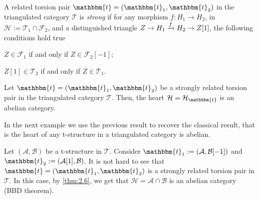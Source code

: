\begin{definition}
  A related torsion pair $\mathbbm{t}=(\mathbbm{t}_1,\mathbbm{t}_2)$ in the triangulated category
  $\mathcal{T}$ is \emph{strong} if for any morphism $f:H_1\to H_2$, in $\mathcal{H}:=\mathcal{T}_1\cap\mathcal{F}_2$,
  and a distinguished triangle $Z\to H_1\xrightarrow{f}H_2\to Z[1]$, the following conditions
  hold true
  \begin{relatedtorsion}
    \item $Z\in\mathcal{F}_1$ if and only if $Z\in\mathcal{F}_2[-1]$;
    \item $Z[1]\in\mathcal{T}_2$ if and only if $Z\in\mathcal{T}_1$.
  \end{relatedtorsion}
\end{definition}

\begin{thm}\label{thm:2.6}
  Let $\mathbbm{t}=(\mathbbm{t}_1,\mathbbm{t}_2)$ be a strongly related torsion pair in
  the triangulated category $\mathcal{T}$. Then, the heart $\mathcal{H}=\mathcal{H}_\mathbbm{t}$
  is an abelian category.
\end{thm}

In the next example we use the previous result to recover the classical result, that is the heart of any t-structure in a triangulated category is abelian.

\begin{example}
  Let $(\mathcal{A},\mathcal{B})$ be a t-structure in $\mathcal{T}$. Consider
  $\mathbbm{t}_1:=(\mathcal{A},\mathcal{B}[-1])$ and $\mathbbm{t}_2 :=(\mathcal{A}[1],\mathcal{B})$.
  It is not hard to see that $\mathbbm{t}=(\mathbbm{t}_1,\mathbbm{t}_2)$ is a strongly related
  torsion pair in $\mathcal{T}$. In this case, by \ref{thm:2.6}, we get that $\mathcal{H}=\mathcal{A}\cap\mathcal{B}$
  is an abelian category (BBD theorem).
\end{example}


